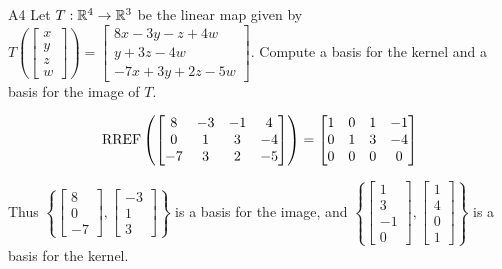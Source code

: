 \begin{problem}{A4}
Let $T: \mathbb{R}^4 \rightarrow \mathbb{R}^3$ be the linear map given by $T\left(\begin{bmatrix} x \\ y \\ z \\ w \end{bmatrix} \right) = \begin{bmatrix}  8x-3y-z+4w \\ y+3z-4w \\ -7x+3y+2z-5w\end{bmatrix} $.
Compute a basis for the kernel and a basis for the image of $T$.
\end{problem}
\begin{solution}
$$\operatorname{RREF} \left( \begin{bmatrix} 8 & -3 & -1 & 4 \\ 0 & 1 & 3 & -4 \\ -7 & 3 & 2 & -5 \end{bmatrix} \right) = \begin{bmatrix} 1 & 0 & 1 & -1 \\ 0 & 1 & 3 & -4 \\ 0 & 0 & 0 & 0 \end{bmatrix}$$

Thus \(\left\{ \begin{bmatrix} 8 \\ 0 \\ -7 \end{bmatrix}, \begin{bmatrix} -3 \\ 1 \\ 3 \end{bmatrix} \right\}\) is a basis for the image, and \( \left\{ \begin{bmatrix} 1 \\ 3 \\ -1 \\ 0 \end{bmatrix}, \begin{bmatrix} 1 \\ 4 \\ 0 \\ 1 \end{bmatrix} \right\} \) is a basis for the kernel.
\end{solution}


